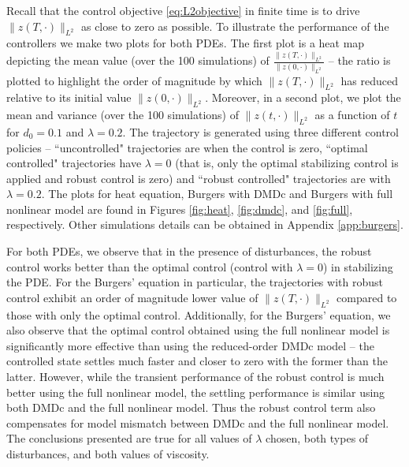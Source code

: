 \documentclass[letterpaper, 10 pt, conference]{ieeeconf}  %
\newcommand{\todo}[1]{{\color{blue} #1}}
\begin{document}
Recall that the control objective \eqref{eq:L2objective} in finite time is to drive $\|z(T,\cdot)\|_{L^2}$  as close to zero as possible. To illustrate the performance of the controllers we make two plots for both PDEs. 
The first plot is a heat map depicting the mean value (over the 100 simulations) of $\frac{\|z(T,\cdot)\|_{L^2}}{\|z(0,\cdot)\|_{L^2}}$ -- the ratio is plotted to highlight the order of magnitude by which $\|z(T,\cdot)\|_{L^2}$  has reduced relative to its initial value $\|z(0,\cdot)\|_{L^2}$. 
Moreover, in a second plot, we plot the mean and variance (over the 100 simulations) of  $\|z(t,\cdot)\|_{L^2}$ as a function of $t$ for $d_0 = 0.1$ and $\lambda = 0.2$. The trajectory is generated using three different control policies -- ``uncontrolled" trajectories are when the control is zero, ``optimal controlled" trajectories have $\lambda = 0$ (that is, only the optimal stabilizing control is applied and robust control is zero) and ``robust controlled" trajectories are with $\lambda = 0.2$. The plots for heat equation, Burgers with DMDc and Burgers with full nonlinear model are found in Figures \ref{fig:heat}, \ref{fig:dmdc}, and \ref{fig:full}, respectively. Other simulations details can be obtained in Appendix \ref{app:burgers}. 

For both PDEs, we observe that in the presence of disturbances, the robust control works better than the optimal control (control with $\lambda = 0$) in stabilizing the PDE. For the Burgers' equation in particular, the trajectories with robust control exhibit an order of magnitude lower value of $\|z(T,\cdot)\|_{L^2}$ compared to those with only the optimal control. Additionally, for the Burgers' equation, we also observe that the optimal control obtained using the full nonlinear model is significantly more effective than using the reduced-order DMDc model -- the controlled state settles much faster and closer to zero with the former than the latter. However, while the transient performance of the robust control is much better using the full nonlinear model, the settling performance is similar using both DMDc and the full nonlinear model. Thus the robust control term also compensates for model mismatch between DMDc and the full nonlinear model. The conclusions presented are true for all values of $\lambda$ chosen, both types of disturbances, and both values of viscosity. 
\end{document}
